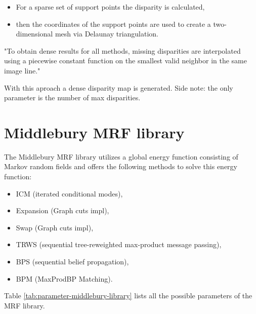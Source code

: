 \begin{itemize}
  \item For a sparse set of support points the disparity is calculated,
  \item then the coordinates of the support points are used to create a two-dimensional mesh via Delaunay triangulation.
\end{itemize}

"To obtain dense results for all methods, missing disparities are interpolated using a piecewise constant function on the smallest valid neighbor in the same image line."

\noindent With this aproach a dense disparity map is generated. Side note: the only parameter is the number of max disparities.

\section{Middlebury MRF library}

The Middlebury MRF library\citep{scharstein2014high, szeliski2008comparative} utilizes a global energy function consisting of Markov random fields and offers the following methods to solve this energy function:

\begin{itemize}
  \item ICM (iterated conditional modes),
  \item Expansion (Graph cuts impl),
  \item Swap (Graph cuts impl),
  \item TRWS (sequential tree-reweighted max-product message passing),
  \item BPS (sequential belief propagation),
  \item BPM (MaxProdBP Matching).
\end{itemize}

\noindent Table \ref{tab:parameter-middlebury-library} lists all the possible parameters of the MRF library.

